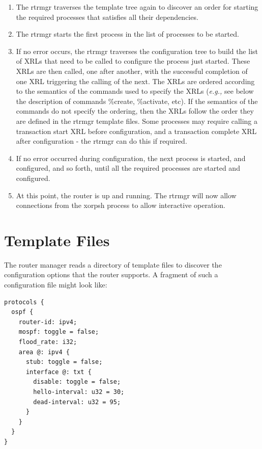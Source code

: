 \documentclass[11pt]{article}
\newcommand{\eg}{\emph{e.g.,}\xspace}
\begin{document}
\begin{enumerate}
  \item The rtrmgr traverses the template tree again to discover an order for
starting the required processes that satisfies all their dependencies.

  \item The rtrmgr starts the first process in the list of processes to be
started.

  \item If no error occurs, the rtrmgr traverses the configuration tree to
build the list of XRLs that need to be called to configure the process
just started.  These XRLs are then called, one after another, with the
successful completion of one XRL triggering the calling of the next.
The XRLs are ordered according to the semantics of the commands
used to specify the XRLs (\eg see below the description of commands
\%create, \%activate, etc). If the semantics of the commands
do not specify the ordering, then the XRLs follow the order they
are defined in the rtrmgr template files.
Some processes may require calling a transaction start XRL before
configuration, and a transaction complete XRL after configuration -
the rtrmgr can do this if required.

  \item If no error occurred during configuration, the next process is started,
and configured, and so forth, until all the required processes are
started and configured.

  \item At this point, the router is up and running.  The rtrmgr will now
allow connections from the xorpsh process to allow interactive
operation.

\end{enumerate}

\newpage

\section{Template Files}

The router manager reads a directory of template files to discover the
configuration options that the router supports.  A fragment of such a
configuration file might look like:

\begin{verbatim}
protocols {
  ospf {
    router-id: ipv4;
    mospf: toggle = false;
    flood_rate: i32;
    area @: ipv4 {
      stub: toggle = false;
      interface @: txt {
        disable: toggle = false;
        hello-interval: u32 = 30;
        dead-interval: u32 = 95;
      }
    }
  }
}
\end{verbatim}
\end{document}
